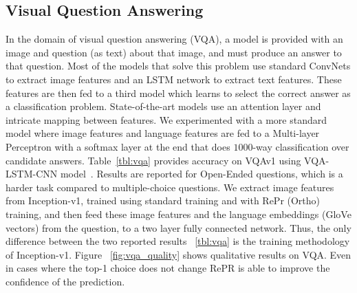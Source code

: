 \subsection{Visual Question Answering}

In the domain of visual question answering (VQA), a model is provided with an image and question (as text) about that image, and must produce an answer to that question.
Most of the models that solve this problem use standard ConvNets to extract image features and an LSTM network to extract text features.
These features are then fed to a third model which learns to select the correct answer as a classification problem. State-of-the-art models use an attention layer and intricate mapping between features. We experimented with a more standard model where image features and language features are fed to a Multi-layer Perceptron with a softmax layer at the end that does $1000$-way classification over candidate answers.
Table~\ref{tbl:vqa} provides accuracy on VQAv1 using VQA-LSTM-CNN model~\cite{Antol2015VQAVQ}.
Results are reported for Open-Ended questions, which is a harder task compared to multiple-choice questions.
We extract image features from Inception-v1, trained using standard training and with RePr (Ortho) training, and then feed these image features and the language embeddings (GloVe vectors) from the question, to a two layer fully connected network. 
Thus, the only difference between the two reported results ~\ref{tbl:vqa} is the training methodology of Inception-v1.
Figure ~\ref{fig:vqa_quality} shows qualitative results on VQA. Even in cases where the top-1 choice does not change RePR is able to improve the confidence of the prediction.


